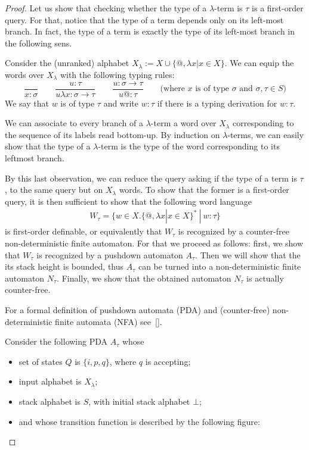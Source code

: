 \begin{proof}
Let us show that checking whether the type of a $\lambda$-term is $\tau$ is a first-order query. For that, notice that the type of a term depends only on its left-most branch. In fact, the type of a term is exactly the type of its left-most branch in the following sens.

Consider the (unranked) alphabet $ X_\lambda:= X\cup \{\text{@}, \lambda x | x\in X\}$. We can equip the words over $X_\lambda$ with the following typing rules:
$$\frac{}{x: \sigma} \qquad \frac{u:\tau}{u\lambda x: \sigma\rightarrow \tau} \qquad \frac{u:\sigma\rightarrow\tau}{u\text{@}:\tau}\qquad\text{(where $x$ is of type $\sigma$ and $\sigma,\tau \in S$)}$$
We say that $w$ is of type $\tau$ and write $w:\tau$ if there is a typing derivation for $w:\tau$.

We can associate to every branch of a $\lambda$-term a word over $X_\lambda$ corresponding to the sequence of its labels read bottom-up. By induction on $\lambda$-terms, we can easily show that the type of a $\lambda$-term is the type of the word corresponding to its leftmost branch. 

By this last observation, we can reduce the query asking if the type of a term is $\tau$, to the same query but on $X_\lambda$ words. To show that the former is a first-order query, it is then sufficient to show that the following word language 
\begin{align*}
W_\tau = \{w\in X.\{\text{@}, \lambda x | x\in X\}^*\ |\ w:\tau \} 
\end{align*}
is first-order definable, or equivalently that  $W_\tau$ is recognized by a counter-free non-deterministic finite automaton. For that we proceed as follows: first, we show that $W_\tau$ is recognized by a pushdown automaton $A_\tau$. Then we will show that the its stack height is bounded, thus $A_\tau$ can be turned into a non-deterministic finite automaton $N_\tau$. Finally, we show that the obtained automaton $N_\tau$ is actually counter-free.  

For a formal definition of pushdown automata (PDA) and (counter-free) non-deterministic finite automata (NFA) see~\ref{}.

Consider the following PDA $A_\tau$ whose
\begin{itemize}
\item set of states $Q$ is $\{i, p, q\}$, where $q$ is accepting;
\item input alphabet is $X_\lambda$;
\item stack alphabet is $S$, with initial stack alphabet $\bot$;
\item and whose transition function is described by the following figure:
\begin{center}


\end{center}
\end{itemize}
\end{proof}
